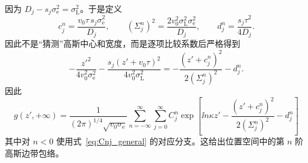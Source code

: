 因为 $D_j-s_j\sigma_{\mathrm e}^2=\sigma_{\mathrm L}^2$。于是定义
\begin{equation}
\boxed{
c_j^n
=\frac{v_0\tau\,s_j\sigma_{\mathrm e}^2}{D_j},
\qquad
(\Sigma_j^n)^2
=\frac{2v_0^2\sigma_{\mathrm L}^2\sigma_{\mathrm e}^2}{D_j},
\qquad
d_j^n
=\frac{s_j\tau^2}{4D_j}.}
\label{eq:cSigmaD}
\end{equation}
因此不是“猜测”高斯中心和宽度，而是逐项比较系数后严格得到
\begin{equation}
-\frac{z'^2}{4v_0^2\sigma_{\mathrm e}^2}
-\frac{s_j(z'+v_0\tau)^2}{4v_0^2\sigma_{\mathrm L}^2}
=-\frac{(z'+c_j^n)^2}{2(\Sigma_j^n)^2}-d_j^n.
\label{eq:complete_square_verified}
\end{equation}
因此
\begin{equation}
\boxed{
g(z',+\infty)
=\frac{1}{(2\pi)^{1/4}\sqrt{v_0\sigma_{\mathrm e}}}
\sum_{n=-\infty}^{\infty}\sum_{j=0}^{\infty}
C_j^n
\exp\!\left[
\ii n\kappa z'
-\frac{(z'+c_j^n)^2}{2(\Sigma_j^n)^2}
-d_j^n
\right]}
\label{eq:gaussian-position-sideband}
\end{equation}
其中对 \(n<0\) 使用式~\eqref{eq:Cnj_general} 的对应分支。这给出位置空间中的第 $n$ 阶高斯边带包络。

